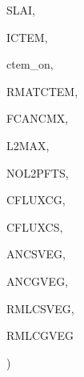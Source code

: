 {\begin{DoxyParamCaption}
\item[{real, dimension(ilg,ictem)}]{S\+L\+A\+I, }
\item[{integer}]{I\+C\+T\+E\+M, }
\item[{logical}]{ctem\+\_\+on, }
\item[{real, dimension(ilg,ictem,ig)}]{R\+M\+A\+T\+C\+T\+E\+M, }
\item[{real, dimension(ilg,ictem)}]{F\+C\+A\+N\+C\+M\+X, }
\item[{integer}]{L2\+M\+A\+X, }
\item[{integer, dimension(ic)}]{N\+O\+L2\+P\+F\+T\+S, }
\item[{real, dimension(ilg)}]{C\+F\+L\+U\+X\+C\+G, }
\item[{real, dimension(ilg)}]{C\+F\+L\+U\+X\+C\+S, }
\item[{real, dimension(ilg,ictem)}]{A\+N\+C\+S\+V\+E\+G, }
\item[{real, dimension(ilg,ictem)}]{A\+N\+C\+G\+V\+E\+G, }
\item[{real, dimension(ilg,ictem)}]{R\+M\+L\+C\+S\+V\+E\+G, }
\item[{real, dimension(ilg,ictem)}]{R\+M\+L\+C\+G\+V\+E\+G}
\end{DoxyParamCaption}
)}\label{CLASST_8f_aae7caf500dbc44213c77f3ff2846253f}

